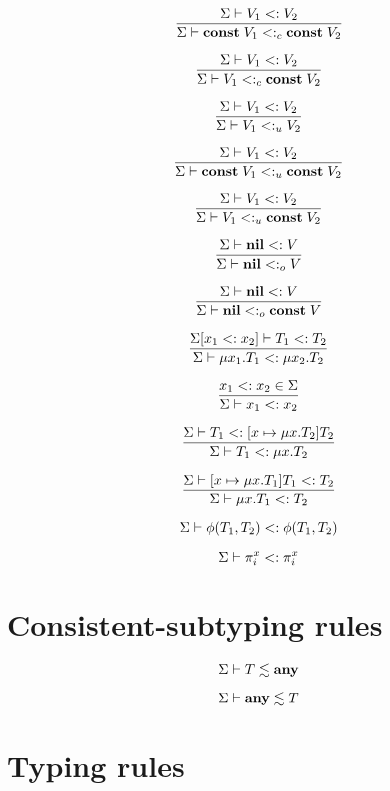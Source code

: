 \[
\dfrac{\Sigma \vdash V_{1} <: V_{2}}
      {\Sigma \vdash \mathbf{const} \; V_{1} <:_{c} \mathbf{const} \; V_{2}}
\]

\[
\dfrac{\Sigma \vdash V_{1} <: V_{2}}
      {\Sigma \vdash V_{1} <:_{c} \mathbf{const} \; V_{2}}
\]

\[
\dfrac{\Sigma \vdash V_{1} <: V_{2}}
      {\Sigma \vdash V_{1} <:_{u} V_{2}}
\]

\[
\dfrac{\Sigma \vdash V_{1} <: V_{2}}
      {\Sigma \vdash \mathbf{const} \; V_{1} <:_{u} \mathbf{const} \; V_{2}}
\]

\[
\dfrac{\Sigma \vdash V_{1} <: V_{2}}
      {\Sigma \vdash V_{1} <:_{u} \mathbf{const} \; V_{2}}
\]

\[
\dfrac{\Sigma \vdash \mathbf{nil} <: V}
      {\Sigma \vdash \mathbf{nil} <:_{o} V}
\]

\[
\dfrac{\Sigma \vdash \mathbf{nil} <: V}
      {\Sigma \vdash \mathbf{nil} <:_{o} \mathbf{const} \; V}
\]

\[
\dfrac{\Sigma[x_{1} <: x_{2}] \vdash T_{1} <: T_{2}}
      {\Sigma \vdash \mu x_{1}.T_{1} <: \mu x_{2}.T_{2}}
\]

\[
\dfrac{x_{1} <: x_{2} \in \Sigma}
      {\Sigma \vdash x_{1} <: x_{2}}
\]

\[
\dfrac{\Sigma \vdash T_{1} <: [x \mapsto \mu x.T_{2}]T_{2}}
      {\Sigma \vdash T_{1} <: \mu x.T_{2}}
\]

\[
\dfrac{\Sigma \vdash [x \mapsto \mu x.T_{1}]T_{1} <: T_{2}}
      {\Sigma \vdash \mu x.T_{1} <: T_{2}}
\]

\[
\Sigma \vdash \phi(T_{1},T_{2}) <: \phi(T_{1},T_{2})
\]

\[
\Sigma \vdash \pi_{i}^{x} <: \pi_{i}^{x}
\]

\section{Consistent-subtyping rules}

\noindent

\[
\Sigma \vdash T \lesssim \mathbf{any}
\]

\[
\Sigma \vdash \mathbf{any} \lesssim T
\]

\section{Typing rules}

